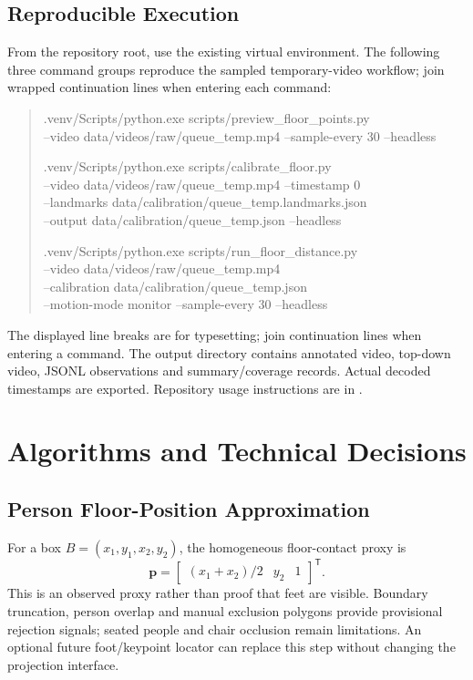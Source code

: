 \subsection{Reproducible Execution}
From the repository root, use the existing virtual environment. The following three command groups reproduce the sampled temporary-video workflow; join wrapped continuation lines when entering each command:
\begin{quote}\small\ttfamily
.venv/Scripts/python.exe scripts/preview\_floor\_points.py\\
\hspace*{1em}--video data/videos/raw/queue\_temp.mp4 --sample-every 30 --headless
\par
.venv/Scripts/python.exe scripts/calibrate\_floor.py\\
\hspace*{1em}--video data/videos/raw/queue\_temp.mp4 --timestamp 0\\
\hspace*{1em}--landmarks data/calibration/queue\_temp.landmarks.json\\
\hspace*{1em}--output data/calibration/queue\_temp.json --headless
\par
.venv/Scripts/python.exe scripts/run\_floor\_distance.py\\
\hspace*{1em}--video data/videos/raw/queue\_temp.mp4\\
\hspace*{1em}--calibration data/calibration/queue\_temp.json\\
\hspace*{1em}--motion-mode monitor --sample-every 30 --headless
\end{quote}
The displayed line breaks are for typesetting; join continuation lines when entering a command. The output directory contains annotated video, top-down video, JSONL observations and summary/coverage records. Actual decoded timestamps are exported. Repository usage instructions are in .

\section{Algorithms and Technical Decisions}
\subsection{Person Floor-Position Approximation}
For a box $B=(x_1,y_1,x_2,y_2)$, the homogeneous floor-contact proxy is
\begin{equation}
\mathbf{p}=\begin{bmatrix}(x_1+x_2)/2 & y_2 & 1\end{bmatrix}^{\mathsf T}.
\label{eq:floor-foot}
\end{equation}
This is an observed proxy rather than proof that feet are visible. Boundary truncation, person overlap and manual exclusion polygons provide provisional rejection signals; seated people and chair occlusion remain limitations. An optional future foot/keypoint locator can replace this step without changing the projection interface.

